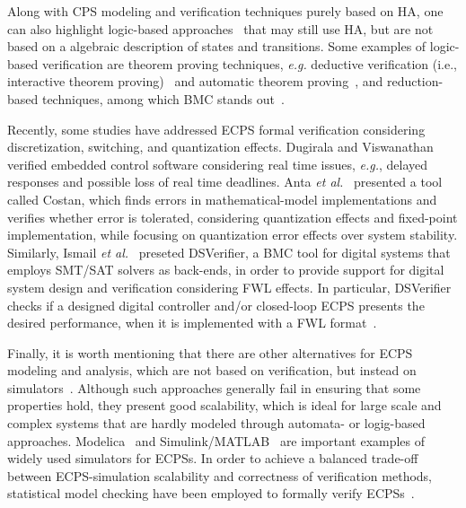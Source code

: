 \documentclass[format=acmsmall, review=false, screen=true]{acmart}
\begin{document}
Along with CPS modeling and verification techniques purely based on HA, one can also highlight logic-based approaches~\cite{Phan15} that may still use HA, but are not based on a algebraic description of states and transitions. Some examples of logic-based verification are theorem proving techniques, {\it e.g.} deductive verification (i.e., interactive theorem proving)~\cite{Nipkow02} and automatic theorem proving~\cite{Platzer07}, and reduction-based techniques, among which BMC stands out~\cite{handbook09}.
 

Recently, some studies have addressed ECPS formal verification considering discretization, switching, and quantization effects.  Dugirala and Viswanathan~\cite{Duggirala2015} verified embedded control software considering real time issues, {\it e.g.}, delayed responses and possible loss of real time deadlines. Anta {\it et al.}~\cite{Anta10} presented a tool called Costan, which finds errors in mathematical-model implementations and verifies whether error is tolerated, considering quantization effects and fixed-point implementation, while focusing on quantization error effects over system stability. Similarly, Ismail {\it et al.}~\cite{dsv_spin2015} preseted DSVerifier, a BMC tool for digital systems that employs SMT/SAT solvers as back-ends, in order to provide support for digital system design and verification considering FWL effects. In particular, DSVerifier checks if a designed digital controller and/or closed-loop ECPS presents the desired performance, when it is implemented with a FWL format~\cite{Bessa16,Bessa17}.

Finally, it is worth mentioning that there are other alternatives for ECPS modeling and analysis, which are not based on verification, but instead on simulators~\cite{Phan2014,Nakajima12,Junjie12}. Although such approaches generally fail in ensuring that some properties hold, they present good scalability, which is ideal for large scale and complex systems that are hardly modeled through automata- or logig-based approaches. Modelica~\cite{Junjie12} and Simulink/MATLAB~\cite{Nakajima12} are important examples of widely used simulators for ECPSs. In order to achieve a balanced trade-off between ECPS-simulation scalability and correctness of verification methods, statistical model checking have been employed to formally verify ECPSs~\cite{Clarke11}.
\end{document}
